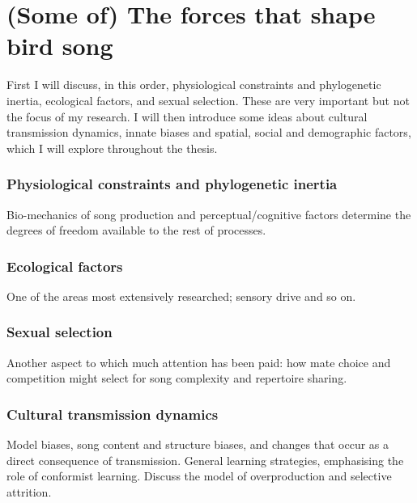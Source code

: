 \documentclass[]{report}
\begin{document}
\hypertarget{some-of-the-forces-that-shape-bird-song}{%
\section{(Some of) The forces that shape bird
song}\label{some-of-the-forces-that-shape-bird-song}}

First I will discuss, in this order, physiological constraints and
phylogenetic inertia, ecological factors, and sexual selection. These
are very important but not the focus of my research. I will then
introduce some ideas about cultural transmission dynamics, innate biases
and spatial, social and demographic factors, which I will explore
throughout the thesis.

\hypertarget{physiological-constraints-and-phylogenetic-inertia}{%
\subsubsection{Physiological constraints and phylogenetic
inertia}\label{physiological-constraints-and-phylogenetic-inertia}}

Bio-mechanics of song production and perceptual/cognitive factors
determine the degrees of freedom available to the rest of processes.

\hypertarget{ecological-factors}{%
\subsubsection{Ecological factors}\label{ecological-factors}}

One of the areas most extensively researched; sensory drive and so on.

\hypertarget{sexual-selection}{%
\subsubsection{Sexual selection}\label{sexual-selection}}

Another aspect to which much attention has been paid: how mate choice
and competition might select for song complexity and repertoire sharing.

\hypertarget{cultural-transmission-dynamics}{%
\subsubsection{Cultural transmission
dynamics}\label{cultural-transmission-dynamics}}

Model biases, song content and structure biases, and changes that occur
as a direct consequence of transmission. General learning strategies,
emphasising the role of conformist learning. Discuss the model of
overproduction and selective attrition.
\end{document}
